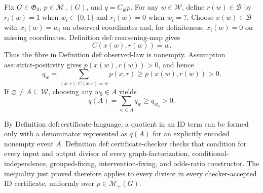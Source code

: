 Fix \(G\in\mathfrak G_3\), \(p\in\mathcal M_+(G)\), and \(q=C_{\#}p\).  For any \(w\in\mathcal W\), define \(r(w)\in\mathcal B\) by \(r_i(w)=1\) when \(w_i\in\{0,1\}\) and \(r_i(w)=0\) when \(w_i=?\).  Choose \(x(w)\in\mathcal B\) with \(x_i(w)=w_i\) on observed coordinates and, for definiteness, \(x_i(w)=0\) on missing coordinates.  Definition \(\mathrm{def{:}coarsening\text{-}map}\) gives
\[
C(x(w),r(w))=w.
\]
Thus the fibre in Definition \(\mathrm{def{:}observed\text{-}law}\) is nonempty.  Assumption \(\mathrm{ass{:}strict\text{-}positivity}\) gives \(p(x(w),r(w))>0\), and hence
\[
q_w=\sum_{(x,r):C(x,r)=w}p(x,r)\ge p(x(w),r(w))>0.
\]
If \(\varnothing\ne A\subseteq\mathcal W\), choosing any \(w_0\in A\) yields
\[
q(A)=\sum_{w\in A}q_w\ge q_{w_0}>0.
\]

By Definition \(\mathrm{def{:}certificate\text{-}language}\), a quotient in an \(\mathrm{ID}\) term can be formed only with a denominator represented as \(q(A)\) for an explicitly encoded nonempty event \(A\).  Definition \(\mathrm{def{:}certificate\text{-}checker}\) checks that condition for every input and output divisor of every graph-factorization, conditional-independence, grouped-fixing, intervention-fixing, and odds-ratio constructor.  The inequality just proved therefore applies to every divisor in every checker-accepted \(\mathrm{ID}\) certificate, uniformly over \(p\in\mathcal M_+(G)\).
